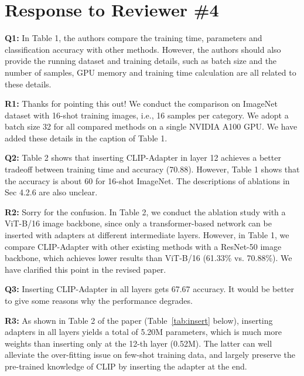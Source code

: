\documentclass[default]{sn-jnl}%
\theoremstyle{thmstyleone}%
\theoremstyle{thmstyletwo}%
\theoremstyle{thmstylethree}%
\begin{document}
\section{Response to Reviewer \#4}
\label{sec:reviewer_4}

\noindent \textbf{Q1:} In Table 1, the authors compare the training time, parameters and classification accuracy with other methods. However, the authors should also provide the running dataset and training details, such as batch size and the number of samples, GPU memory and training time calculation are all related to these details. 

\vspace{0.1cm}
\noindent \textbf{R1:} Thanks for pointing this out! We conduct the comparison on ImageNet~\cite{deng2009imagenet} dataset with 16-shot training images, i.e., 16 samples per category. We adopt a batch size 32 for all compared methods on a single NVIDIA A100 GPU. We have added these details in the caption of Table 1.

\vspace{0.4cm}

\noindent \textbf{Q2:} Table 2 shows that inserting CLIP-Adapter in layer 12 achieves a better tradeoff between training time and accuracy (70.88). However, Table 1 shows that the accuracy is about 60 for 16-shot ImageNet. The descriptions of ablations in Sec 4.2.6 are also unclear.

\vspace{0.1cm}
\noindent \textbf{R2:} Sorry for the confusion.
In Table 2, we conduct the ablation study with a ViT-B/16 image backbone, since only a transformer-based network can be inserted with adapters at different intermediate layers. However, in Table 1, we compare CLIP-Adapter with other existing methods with a ResNet-50 image backbone, which achieves lower results than ViT-B/16 (61.33\% vs. 70.88\%). We have clarified this point in the revised paper.


\vspace{0.4cm}
\noindent \textbf{Q3:} Inserting CLIP-Adapter in all layers gets 67.67 accuracy. It would be better to give some reasons why the performance degrades.

\vspace{0.1cm}
\noindent \textbf{R3:} As shown in Table 2 of the paper (Table~\ref{tab:insert} below), inserting adapters in all layers yields a total of 5.20M parameters, which is much more weights than inserting only at the 12-th layer (0.52M). The latter can well alleviate the over-fitting issue on few-shot training data, and largely preserve the pre-trained knowledge of CLIP by inserting the adapter at the end.
\end{document}
